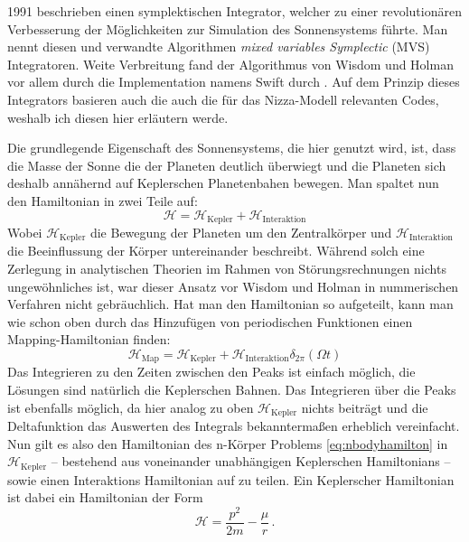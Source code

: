 \documentclass[12pt,a4paper,twoside]{article}
\renewcommand{\H}{\mathcal H}
\begin{document}
1991 beschrieben \cite{Wisdom1991} einen symplektischen Integrator, welcher zu einer revolutionären Verbesserung der Möglichkeiten zur Simulation des Sonnensystems führte.
Man nennt diesen und verwandte Algorithmen \textit{mixed variables Symplectic} (MVS) Integratoren. 
Weite Verbreitung fand der Algorithmus von Wisdom und Holman vor allem durch die Implementation namens Swift durch \cite{Levison1994}.
Auf dem Prinzip dieses Integrators basieren auch die auch die für das Nizza-Modell relevanten Codes, weshalb ich diesen hier erläutern werde.

Die grundlegende Eigenschaft des Sonnensystems, die hier genutzt wird, ist, dass die Masse der Sonne die der Planeten deutlich überwiegt und die Planeten sich deshalb annähernd auf Keplerschen Planetenbahen bewegen. Man spaltet nun den Hamiltonian in zwei Teile auf:
\begin{equation}
\H = \H_{\mathrm{Kepler}} + \H_{\mathrm{Interaktion}}
\end{equation}
Wobei $\H_{\mathrm{Kepler}}$ die Bewegung der Planeten um den Zentralkörper und $\H_{\mathrm{Interaktion}}$ die Beeinflussung der Körper untereinander beschreibt. Während solch eine Zerlegung in analytischen Theorien im Rahmen von Störungsrechnungen nichts ungewöhnliches ist, war dieser Ansatz vor Wisdom und Holman in nummerischen Verfahren nicht gebräuchlich\cite{Wisdom1991}. Hat man den Hamiltonian so aufgeteilt, kann man wie schon oben durch das Hinzufügen von periodischen Funktionen einen Mapping-Hamiltonian finden:
\begin{equation}
\H_{\mathrm{Map}} = \H_{\mathrm{Kepler}} + \H_{\mathrm{Interaktion}}\delta_{2\pi}(\Omega t)
\end{equation} %
Das Integrieren zu den Zeiten zwischen den Peaks ist einfach möglich, die Lösungen sind natürlich die Keplerschen Bahnen. Das Integrieren über die Peaks ist ebenfalls möglich, da hier analog zu oben $\H_{\mathrm{Kepler}}$ nichts beiträgt und die Deltafunktion das Auswerten des Integrals bekanntermaßen erheblich vereinfacht\cite{Wisdom1991}. %
Nun gilt es also den Hamiltonian des n-Körper Problems \ref{eq:nbodyhamilton} in $\H_{\mathrm{Kepler}}$ -- bestehend aus voneinander unabhängigen Keplerschen Hamiltonians -- sowie einen Interaktions Hamiltonian auf zu teilen. Ein Keplerscher Hamiltonian ist dabei ein Hamiltonian der Form
\begin{equation}
\H = \frac{p^2}{2m} - \frac{\mu}{r} \,.
\end{equation}
\end{document}
